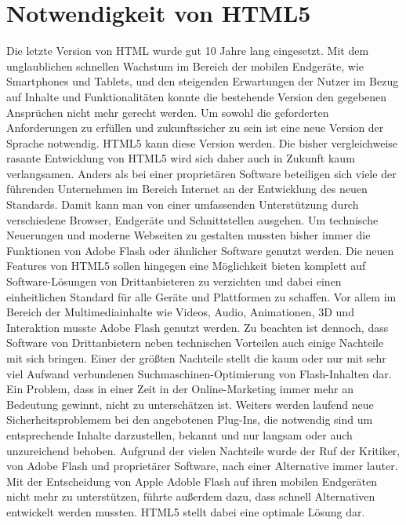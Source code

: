\section{Notwendigkeit von HTML5}
Die letzte Version von HTML wurde gut 10 Jahre lang eingesetzt. Mit dem
unglaublichen schnellen Wachstum im Bereich der mobilen Endgeräte, wie
Smartphones und Tablets, und den steigenden Erwartungen der Nutzer im Bezug
auf Inhalte und Funktionalitäten konnte die bestehende Version den gegebenen
Ansprüchen nicht mehr gerecht werden. Um sowohl die geforderten Anforderungen
zu erfüllen und zukunftssicher zu sein ist eine neue Version der Sprache
notwendig. HTML5 kann diese Version werden.
\newline\newline
Die bisher vergleichweise rasante Entwicklung von HTML5 wird sich daher auch
in Zukunft kaum verlangsamen. Anders als bei einer proprietären Software
beteiligen sich viele der führenden Unternehmen im Bereich Internet an der
Entwicklung des neuen Standards. Damit kann man von einer umfassenden
Unterstützung durch verschiedene Browser, Endgeräte und Schnittstellen
ausgehen.
\newline\newline
Um technische Neuerungen und moderne Webseiten zu gestalten mussten bisher
immer die Funktionen von Adobe Flash oder ähnlicher Software genutzt werden.
Die neuen Features von HTML5 sollen hingegen eine Möglichkeit bieten
komplett auf Software-Lösungen von Drittanbieteren zu verzichten und dabei
einen einheitlichen Standard für alle Geräte und Plattformen zu schaffen.
\newline\newline
Vor allem im Bereich der Multimediainhalte wie Videos, Audio, Animationen, 3D
und Interaktion musste Adobe Flash genutzt werden. Zu beachten ist dennoch,
dass Software von Drittanbietern neben technischen Vorteilen auch einige
Nachteile mit sich bringen. Einer der größten Nachteile stellt die kaum
oder nur mit sehr viel Aufwand verbundenen Suchmaschinen-Optimierung von
Flash-Inhalten dar. Ein Problem, dass in einer Zeit in der Online-Marketing
immer mehr an Bedeutung gewinnt, nicht zu unterschätzen ist. Weiters
werden laufend neue Sicherheitsproblemem bei den angebotenen Plug-Ins, die
notwendig sind um entsprechende Inhalte darzustellen, bekannt und nur langsam
oder auch unzureichend behoben. Aufgrund der vielen Nachteile wurde der Ruf
der Kritiker, von Adobe Flash und proprietärer Software, nach einer
Alternative immer lauter.
\newline\newline
Mit der Entscheidung von Apple Adoble Flash auf ihren mobilen Endgeräten
nicht mehr zu unterstützen, führte außerdem dazu, dass schnell Alternativen
entwickelt werden mussten. HTML5 stellt dabei eine optimale Lösung dar.
